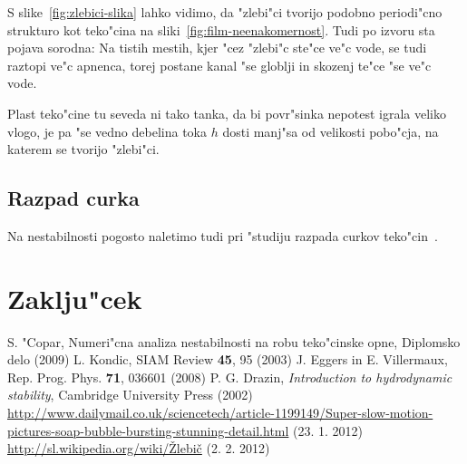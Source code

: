 \documentclass[a4paper,10pt]{article}
\begin{document}
S slike~\ref{fig:zlebici-slika} lahko vidimo, da "zlebi"ci tvorijo podobno periodi"cno strukturo kot teko"cina na sliki~\ref{fig:film-neenakomernost}. Tudi po izvoru sta pojava sorodna: Na tistih mestih, kjer "cez "zlebi"c ste"ce ve"c vode, se tudi raztopi ve"c apnenca, torej postane kanal "se globlji in skozenj te"ce "se ve"c vode. 

Plast teko"cine tu seveda ni tako tanka, da bi povr"sinka nepotest igrala veliko vlogo, je pa "se vedno debelina toka $h$ dosti manj"sa od velikosti pobo"cja, na katerem se tvorijo "zlebi"ci. 


\subsection{Razpad curka}

Na nestabilnosti pogosto naletimo tudi pri "studiju razpada curkov teko"cin~\cite{eggers}. 

\section{Zaklju"cek}

\begin{thebibliography}{3}
   S. "Copar, Numeri"cna analiza nestabilnosti na robu teko"cinske opne, Diplomsko delo (2009)
   L. Kondic, SIAM Review \textbf{45}, 95 (2003)
   J. Eggers in E. Villermaux, Rep. Prog. Phys. \textbf{71}, 036601 (2008)
   P. G. Drazin, \textit{Introduction to hydrodynamic stability}, Cambridge University Press (2002)
   \url{http://www.dailymail.co.uk/sciencetech/article-1199149/Super-slow-motion-pictures-soap-bubble-bursting-stunning-detail.html} (23. 1. 2012)
   \href{http://sl.wikipedia.org/wiki/\%C5\%BDlebi\%C4\%8Di}{http://sl.wikipedia.org/wiki/\v Zlebič} (2. 2. 2012)
\end{thebibliography}
\end{document}
